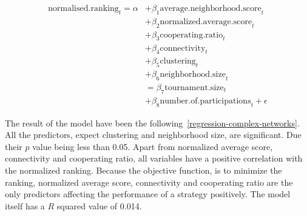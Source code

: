 \begin{align}
	\mathrm{normalised.ranking}_{t} = \alpha
	  & + \beta_{1}  \mathrm{average.neighborhood.score}_{t}          \\
	  & + \beta_{2}  \mathrm{normalized.average.score}_{t}            \\
	  & + \beta_{3}  \mathrm{cooperating.ratio}_{t}                   \\
	  & + \beta_{4}  \mathrm{connectivity}_{t}                        \\
	  & + \beta_{5}  \mathrm{clustering}_{t}                          \\
	  & + \beta_{6}  \mathrm{neighborhood.size}_{t}                   \\
	  & = \beta_{7}  \mathrm{tournament.size}_{t}                     \\
	  & + \beta_{8}  \mathrm{number.of.participations}_{t} + \epsilon
\end{align}

The result of the model have been the following~\ref{regression-complex-networks}.
All the predictors, expect clustering and neighborhood size, are significant.
Due their \(p\) value being less than 0.05.
Apart from normalized average score, connectivity and cooperating ratio, all
variables have a positive correlation with the normalized ranking. Because the
objective function, is to minimize the ranking, normalized average score,
connectivity and cooperating ratio are the only predictors affecting the performance
of a strategy positively. The model itself has a \(R\) squared value of 0.014.

